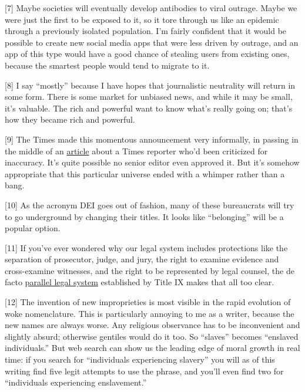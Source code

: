 {[}7{]} Maybe societies will eventually develop antibodies to viral
outrage. Maybe we were just the first to be exposed to it, so it tore
through us like an epidemic through a previously isolated population.
I'm fairly confident that it would be possible to create new social
media apps that were less driven by outrage, and an app of this type
would have a good chance of stealing users from existing ones, because
the smartest people would tend to migrate to it.

{[}8{]} I say ``mostly'' because I have hopes that journalistic
neutrality will return in some form. There is some market for unbiased
news, and while it may be small, it's valuable. The rich and powerful
want to know what's really going on; that's how they became rich and
powerful.

{[}9{]} The Times made this momentous announcement very informally, in
passing in the middle of an
\href{https://www.nytimes.com/2020/10/11/business/media/new-york-times-rukmini-callimachi-caliphate.html}{article}
about a Times reporter who'd been criticized for inaccuracy. It's quite
possible no senior editor even approved it. But it's somehow appropriate
that this particular universe ended with a whimper rather than a bang.

{[}10{]} As the acronym DEI goes out of fashion, many of these
bureaucrats will try to go underground by changing their titles. It
looks like ``belonging'' will be a popular option.

{[}11{]} If you've ever wondered why our legal system includes
protections like the separation of prosecutor, judge, and jury, the
right to examine evidence and cross-examine witnesses, and the right to
be represented by legal counsel, the de facto
\href{https://www.nytimes.com/2020/03/18/magazine/title-ix-sexual-harassment-accusations.html}{parallel
legal system} established by Title IX makes that all too clear.

{[}12{]} The invention of new improprieties is most visible in the rapid
evolution of woke nomenclature. This is particularly annoying to me as a
writer, because the new names are always worse. Any religious observance
has to be inconvenient and slightly absurd; otherwise gentiles would do
it too. So ``slaves'' becomes ``enslaved individuals.'' But web search
can show us the leading edge of moral growth in real time: if you search
for ``individuals experiencing slavery'' you will as of this writing
find five legit attempts to use the phrase, and you'll even find two for
``individuals experiencing enslavement.''

